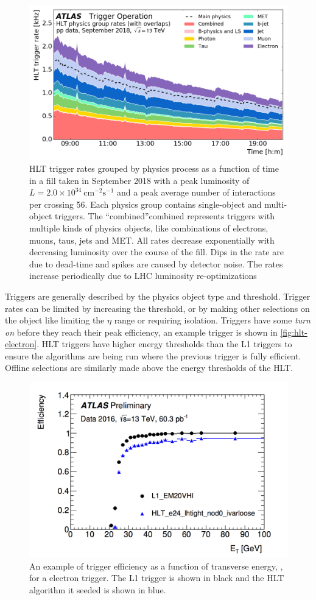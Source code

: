 \begin{figure}[!h]
\centering
\includegraphics[width=.6\textwidth]{figures/Detector/hlt-rates.png}
\caption{\ac{HLT} trigger rates grouped by physics process as a function of time in a fill taken in September 2018 with a peak luminosity of $L = 2.0 \times 10^{34}~\text{cm}^{-2}\text{s}^{-1}$ and a peak average number of interactions per crossing 56. Each physics group contains single-object and multi-object triggers. The ``combined''combined represents triggers with multiple kinds of physics objects, like combinations of electrons, muons, taus, jets and \ac{MET}. All rates decrease exponentially with decreasing luminosity over the course of the fill.  Dips in the rate are due to dead-time and spikes are caused by detector noise. The rates increase periodically due to LHC luminosity re-optimizations  \cite{trigger-public}}
\label{fig:hlt-rates}
\end{figure}

Triggers are generally described by the physics object type and \pt threshold. Trigger rates can be limited by increasing the \pt threshold, or by making other selections on the object like limiting the $\eta$ range or requiring isolation. Triggers have some \emph{turn on} before they reach their peak efficiency, an example trigger is shown in \autoref{fig:hlt-electron}. \ac{HLT} triggers have higher energy thresholds than the \ac{L1} triggers to ensure the algorithms are being run where the previous trigger is fully efficient. Offline selections are similarly made above the energy thresholds of the \ac{HLT}.

\begin{figure}[!h]
\centering
\includegraphics[width=.6\textwidth]{figures/Detector/hlt-electron.png}
\caption{An example of trigger efficiency as a function of transverse energy, \et, for a electron trigger. The \ac{L1} trigger is shown in black and the \ac{HLT} algorithm it seeded is shown in blue.  \cite{egamma-trigger-public}}
\label{fig:hlt-electron}
\end{figure}


